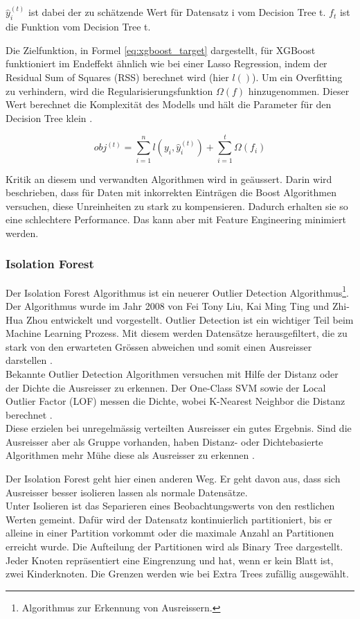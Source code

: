 $\hat{y}_{i}^{(t)}$ ist dabei der zu schätzende Wert für Datensatz i vom Decision Tree t. $f_t$ ist die Funktion vom Decision Tree t.

Die Zielfunktion, in Formel \eqref{eq:xgboost_target} dargestellt, für XGBoost funktioniert im Endeffekt ähnlich wie bei einer Lasso Regression, indem der Residual Sum of Squares (RSS) berechnet wird (hier $l()$).
Um ein Overfitting zu verhindern, wird die Regularisierungsfunktion $\Omega(f)$ hinzugenommen. Dieser Wert berechnet die Komplexität des Modells und hält die Parameter für den Decision Tree klein \cite{xgboost_1, xgboost_2}.

\begin{equation}
\label{eq:xgboost_target}
obj^{(t)} = \sum_{i=1}^{n} l(y_i, \hat{y}_{i}^{(t)}) + \sum_{i=1}^{t} \Omega(f_i)
\end{equation}

Kritik an diesem und verwandten Algorithmen wird in \cite{critic} geäussert. Darin wird beschrieben, dass für Daten mit inkorrekten Einträgen die Boost Algorithmen versuchen, diese Unreinheiten zu stark zu kompensieren. Dadurch erhalten sie so eine schlechtere Performance. Das kann aber mit Feature Engineering minimiert werden.
%
\subsubsection{Isolation Forest}
Der Isolation Forest Algorithmus ist ein neuerer Outlier Detection Algorithmus\footnote{Algorithmus zur Erkennung von Ausreissern.}. Der Algorithmus wurde im Jahr 2008 von Fei Tony Liu, Kai Ming Ting und Zhi-Hua Zhou entwickelt und vorgestellt. Outlier Detection ist ein wichtiger Teil beim Machine Learning Prozess. Mit diesem werden Datensätze herausgefiltert, die zu stark von den erwarteten Grössen abweichen und somit einen Ausreisser darstellen \cite{isolation_forest_1}.\\
Bekannte Outlier Detection Algorithmen versuchen mit Hilfe der Distanz oder der Dichte die Ausreisser zu erkennen. Der One-Class SVM sowie der Local Outlier Factor (LOF) messen die Dichte, wobei K-Nearest Neighbor die Distanz berechnet \cite{isolation_forest_2}.\\
Diese erzielen bei unregelmässig verteilten Ausreisser ein gutes Ergebnis. Sind die Ausreisser aber als Gruppe vorhanden, haben Distanz- oder Dichtebasierte Algorithmen mehr Mühe diese als Ausreisser zu erkennen \cite{isolation_forest_3}.

Der Isolation Forest geht hier einen anderen Weg. Er geht davon aus, dass sich Ausreisser besser isolieren lassen als normale Datensätze.\\
Unter Isolieren ist das Separieren eines Beobachtungswerts von den restlichen Werten gemeint. Dafür wird der Datensatz kontinuierlich partitioniert, bis er alleine in einer Partition vorkommt oder die maximale Anzahl an Partitionen erreicht wurde. Die Aufteilung der Partitionen wird als Binary Tree dargestellt. Jeder Knoten repräsentiert eine Eingrenzung und hat, wenn er kein Blatt ist, zwei Kinderknoten. Die Grenzen werden wie bei Extra Trees zufällig ausgewählt.

